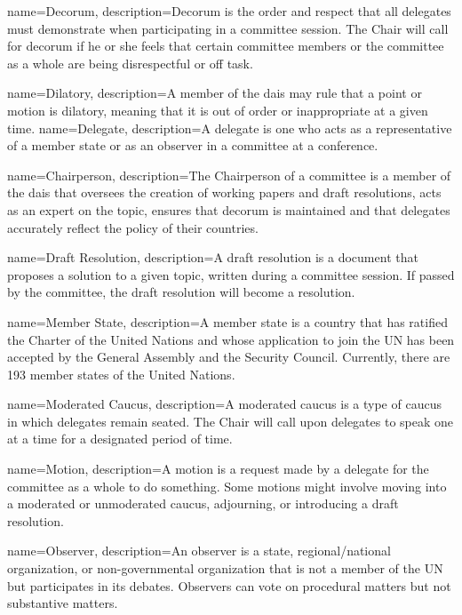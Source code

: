 {
	name={Decorum},
	description={Decorum is the order and respect that all delegates must demonstrate when participating in a committee session. The Chair will call for decorum if he or she feels that certain committee members or the committee as a whole are being disrespectful or off task.}

{
	name={Dilatory},
	description={A member of the dais may rule that a point or motion is dilatory, meaning that it is out of order or inappropriate at a given time.}
}
{
	name={Delegate},
	description={A delegate is one who acts as a representative of a member state or as an observer in a committee at a conference.}
}

{
	name={Chairperson},
	description={The Chairperson of a committee is a member of the dais that oversees the creation of working papers and draft resolutions, acts as an expert on the topic, ensures that decorum is maintained and that delegates accurately reflect the policy of their countries.}
}

{
	name={Draft Resolution},
	description={A draft resolution is a document that proposes a solution to a given topic, written during a committee session. If passed by the committee, the draft resolution will become a resolution.}
}

{
	name={Member State},
	description={A member state is a country that has ratified the Charter of the United Nations and whose application to join the UN has been accepted by the General Assembly and the Security Council. Currently, there are 193 member states of the United Nations.}
}

{
	name={Moderated Caucus},
	description={A moderated caucus is a type of caucus in which delegates remain seated. The Chair will call upon delegates to speak one at a time for a designated period of time.}
}

{
	name={Motion},
	description={A motion is a request made by a delegate for the committee as a whole to do something. Some motions might involve moving into a moderated or unmoderated caucus, adjourning, or introducing a draft resolution.}
}

	name={Observer},
	description={An observer is a state, regional/national organization, or non-governmental organization that is not a member of the UN but participates in its debates. Observers can vote on procedural matters but not substantive matters.}
}

